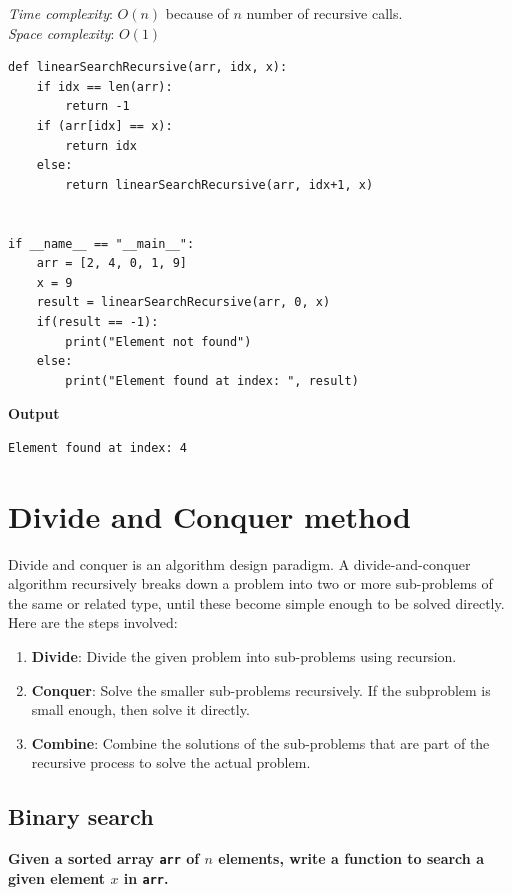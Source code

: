 \documentclass[a4paper,11pt]{book}
\begin{document}
\noindent \textit{Time complexity}: $O(n)$ because of $n$ number of recursive calls.\\
\noindent \textit{Space complexity}: $O(1)$

\begin{lstlisting}
def linearSearchRecursive(arr, idx, x):
    if idx == len(arr):
        return -1
    if (arr[idx] == x):
        return idx
    else:
        return linearSearchRecursive(arr, idx+1, x)


if __name__ == "__main__":
    arr = [2, 4, 0, 1, 9]
    x = 9
    result = linearSearchRecursive(arr, 0, x)
    if(result == -1):
        print("Element not found")
    else:
        print("Element found at index: ", result)
\end{lstlisting}
\textbf{Output}
\begin{lstlisting}
Element found at index: 4
\end{lstlisting}


\section{Divide and Conquer method}

\noindent Divide and conquer is an algorithm design paradigm. A divide-and-conquer algorithm recursively breaks down a problem into two or more sub-problems of the same or related type, until these become simple enough to be solved directly. Here are the steps involved:
\begin{enumerate}
    \item \textbf{Divide}: Divide the given problem into sub-problems using recursion.
    \item \textbf{Conquer}: Solve the smaller sub-problems recursively. If the subproblem is small enough, then solve it directly.
    \item \textbf{Combine}: Combine the solutions of the sub-problems that are part of the recursive process to solve the actual problem.
\end{enumerate}
\subsection{Binary search}

\textbf{Given a sorted array \lstinline{arr} of $n$ elements, write a function to search a given element $x$ in \lstinline{arr}.}
\vspace{4mm}
\end{document}
